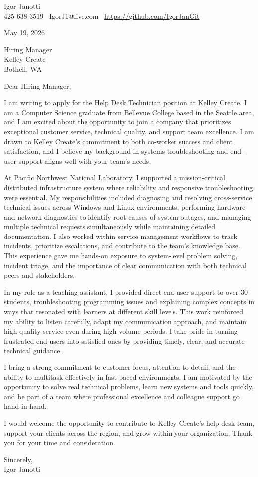 \documentclass[11pt]{article}
\begin{document}
Igor Janotti\\
425-638-3519 \textbar\ IgorJ1@live.com \textbar\ \url{https://github.com/IgorJanGit}

May 19, 2026

Hiring Manager\\
Kelley Create\\
Bothell, WA

Dear Hiring Manager,

I am writing to apply for the Help Desk Technician position at Kelley Create. I am a Computer Science graduate from Bellevue College based in the Seattle area, and I am excited about the opportunity to join a company that prioritizes exceptional customer service, technical quality, and support team excellence. I am drawn to Kelley Create's commitment to both co-worker success and client satisfaction, and I believe my background in systems troubleshooting and end-user support aligns well with your team's needs.

At Pacific Northwest National Laboratory, I supported a mission-critical distributed infrastructure system where reliability and responsive troubleshooting were essential. My responsibilities included diagnosing and resolving cross-service technical issues across Windows and Linux environments, performing hardware and network diagnostics to identify root causes of system outages, and managing multiple technical requests simultaneously while maintaining detailed documentation. I also worked within service management workflows to track incidents, prioritize escalations, and contribute to the team's knowledge base. This experience gave me hands-on exposure to system-level problem solving, incident triage, and the importance of clear communication with both technical peers and stakeholders.

In my role as a teaching assistant, I provided direct end-user support to over 30 students, troubleshooting programming issues and explaining complex concepts in ways that resonated with learners at different skill levels. This work reinforced my ability to listen carefully, adapt my communication approach, and maintain high-quality service even during high-volume periods. I take pride in turning frustrated end-users into satisfied ones by providing timely, clear, and accurate technical guidance.

I bring a strong commitment to customer focus, attention to detail, and the ability to multitask effectively in fast-paced environments. I am motivated by the opportunity to solve real technical problems, learn new systems and tools quickly, and be part of a team where professional excellence and colleague support go hand in hand.

I would welcome the opportunity to contribute to Kelley Create's help desk team, support your clients across the region, and grow within your organization. Thank you for your time and consideration.

Sincerely,\\
Igor Janotti
\end{document}
